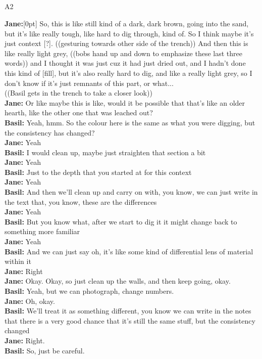 \documentclass[
]{article}
\makeatletter
\let\oldsubparagraph\subparagraph
\renewcommand{\subparagraph}{
    \@ifstar
      \xxxSubParagraphStar
      \xxxSubParagraphNoStar
  }
\newcommand{\xxxSubParagraphStar}[1]{\oldsubparagraph*{#1}\mbox{}}
\newcommand{\xxxSubParagraphNoStar}[1]{\oldsubparagraph{#1}\mbox{}}
\newcommand{\paragraphnumber}[1]{\marginnote{\color{lightgray}\tiny{#1}}[0pt]}
\makeatother
\begin{document}
\subparagraph{A2}\label{sec-A2}

\textbf{Jane:}\paragraphnumber{[53]} So, this is like still kind of a
dark, dark brown, going into the sand, but it's like really tough, like
hard to dig through, kind of. So I think maybe it's just context
{[}?{]}. ((gesturing towards other side of the trench)) And then this is
like really light grey, ((bobs hand up and down to emphasize these last
three words)) and I thought it was just cuz it had just dried out, and I
hadn't done this kind of {[}fill{]}, but it's also really hard to dig,
and like a really light grey, so I don't know if it's just remnants of
this part, or what...\\
((Basil gets in the trench to take a closer look))\\
\textbf{Jane:} Or like maybe this is like, would it be possible that
that's like an older hearth, like the other one that was leached out?\\
\textbf{Basil:} Yeah, hmm. So the colour here is the same as what you
were digging, but the consistency has changed?\\
\textbf{Jane:} Yeah\\
\textbf{Basil:} I would clean up, maybe just straighten that section a
bit\\
\textbf{Jane:} Yeah\\
\textbf{Basil:} Just to the depth that you started at for this context\\
\textbf{Jane:} Yeah\\
\textbf{Basil:} And then we'll clean up and carry on with, you know, we
can just write in the text that, you know, these are the differences\\
\textbf{Jane:} Yeah\\
\textbf{Basil:} But you know what, after we start to dig it it might
change back to something more familiar\\
\textbf{Jane:} Yeah\\
\textbf{Basil:} And we can just say oh, it's like some kind of
differential lens of material within it\\
\textbf{Jane:} Right\\
\textbf{Jane:} Okay. Okay, so just clean up the walls, and then keep
going, okay.\\
\textbf{Basil:} Yeah, but we can photograph, change numbers.\\
\textbf{Jane:} Oh, okay.\\
\textbf{Basil:} We'll treat it as something different, you know we can
write in the notes that there is a very good chance that it's still the
same stuff, but the consistency changed\\
\textbf{Jane:} Right.\\
\textbf{Basil:} So, just be careful.
\end{document}
